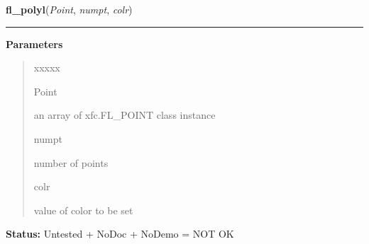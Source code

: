 \hspace{.8\funcindent}\begin{boxedminipage}{\funcwidth}

    \raggedright \textbf{fl\_polyl}(\textit{Point}, \textit{numpt}, \textit{colr})

    \vspace{-1.5ex}

    \rule{\textwidth}{0.5\fboxrule}
\setlength{\parskip}{2ex}
\setlength{\parskip}{1ex}
      \textbf{Parameters}
      \vspace{-1ex}

      \begin{quote}
        \begin{Ventry}{xxxxx}

          \item[Point]

          an array of xfc.FL\_POINT class instance

          \item[numpt]

          number of points

          \item[colr]

          value of color to be set

        \end{Ventry}

      \end{quote}

\textbf{Status:} Untested + NoDoc + NoDemo = NOT OK



    \end{boxedminipage}

    \label{xformslib:library:fl_polybound}

    \vspace{0.5ex}

